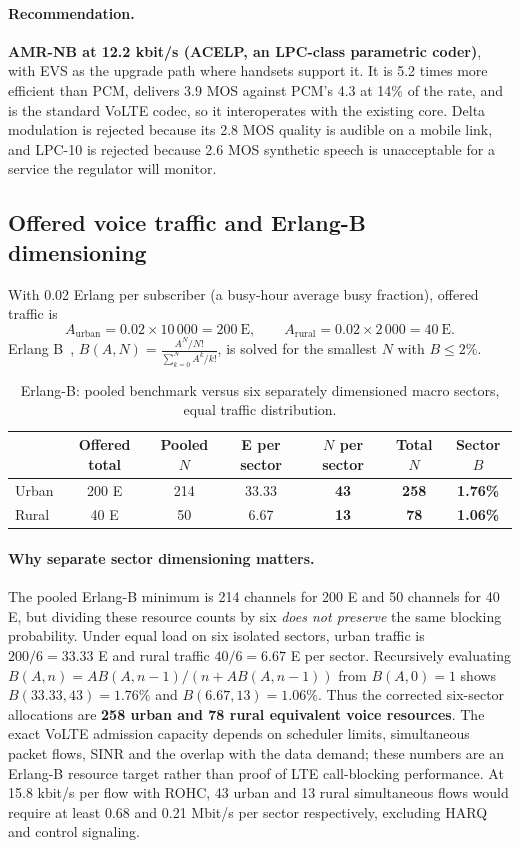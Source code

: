 \documentclass[9pt,a4paper]{extarticle}
\newcommand{\key}[1]{\textbf{#1}}
\begin{document}
\paragraph{Recommendation.} \key{AMR-NB at 12.2 kbit/s (ACELP, an LPC-class parametric coder)},
with EVS as the upgrade path where handsets support it. It is 5.2 times more efficient than PCM,
delivers 3.9 MOS against PCM's 4.3 at 14\% of the rate, and is the standard VoLTE codec, so it
interoperates with the existing core. Delta modulation is rejected because its 2.8 MOS quality is
audible on a mobile link, and LPC-10 is rejected because 2.6 MOS synthetic speech is unacceptable
for a service the regulator will monitor.

\subsection{Offered voice traffic and Erlang-B dimensioning}
With 0.02 Erlang per subscriber (a busy-hour average busy fraction), offered traffic is
\[
A_{\text{urban}} = 0.02\times10\,000 = 200\ \text{E},\qquad
A_{\text{rural}} = 0.02\times2\,000 = 40\ \text{E}.
\]
Erlang B~\cite{erlang}, $B(A,N)=\frac{A^N/N!}{\sum_{k=0}^{N}A^k/k!}$, is solved for the smallest $N$ with
$B\leq2\%$.

\begin{table}[H]\centering\small
\caption{Erlang-B: pooled benchmark versus six separately dimensioned macro sectors, equal traffic distribution.}
\label{tab:voice}
\begin{tabular}{@{}lcccccc@{}}\toprule
& Offered total & Pooled $N$ & E per sector & $N$ per sector & Total $N$ & Sector $B$ \\ \midrule
Urban & 200 E & 214 & 33.33 & \textbf{43} & \textbf{258} & \textbf{1.76\%} \\
Rural & 40 E & 50 & 6.67 & \textbf{13} & \textbf{78} & \textbf{1.06\%} \\ \bottomrule
\end{tabular}
\end{table}
\paragraph{Why separate sector dimensioning matters.} The pooled Erlang-B minimum
is 214 channels for 200 E and 50 channels for 40 E, but dividing these resource
counts by six \emph{does not preserve} the same blocking probability.
Under equal load on six isolated sectors, urban traffic is $200/6=33.33$ E
and rural traffic $40/6=6.67$ E per sector. Recursively evaluating
$B(A,n)=A B(A,n-1)/(n+A B(A,n-1))$ from $B(A,0)=1$ shows
$B(33.33,43)=1.76\%$ and $B(6.67,13)=1.06\%$. Thus the corrected
six-sector allocations are \key{258 urban and 78 rural equivalent voice resources}.
The exact VoLTE admission capacity depends on scheduler limits, simultaneous
packet flows, SINR and the overlap with the data demand; these numbers are
an Erlang-B resource target rather than proof of LTE call-blocking performance.
At 15.8 kbit/s per flow with ROHC, 43 urban and 13 rural simultaneous
flows would require at least 0.68 and 0.21 Mbit/s per sector respectively,
excluding HARQ and control signaling.
\end{document}
